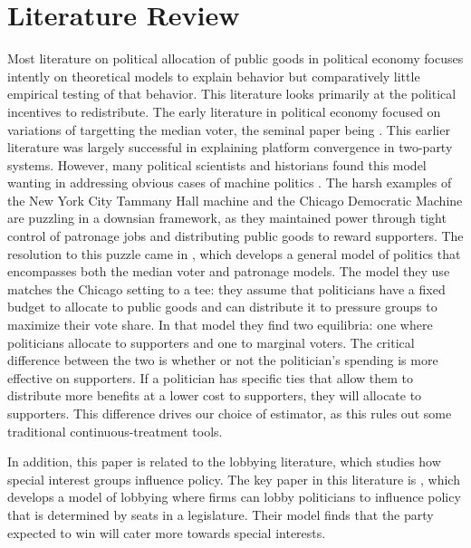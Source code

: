 \section{Literature Review}\label{sec:lit_review}

Most literature on political allocation of public goods in political economy focuses intently on theoretical models to explain behavior but comparatively little empirical testing of that behavior. 
This literature looks primarily at the political incentives to redistribute.
The early literature in political economy focused on variations of targetting the median voter, the seminal paper being \cite{downs1957economic}.
This earlier literature was largely successful in explaining platform convergence in two-party systems.
However, many political scientists and historians found this model wanting in addressing obvious cases of machine politics \cite{rakove1975don} \cite{golway2014machine}.
The harsh examples of the New York City Tammany Hall machine and the Chicago Democratic Machine are puzzling in a downsian framework, as they maintained power through tight control of patronage jobs and distributing public goods to reward supporters.
The resolution to this puzzle came in \cite{dixit_londregan1996}, which develops a general model of politics that encompasses both the median voter and patronage models.
The model they use matches the Chicago setting to a tee: they assume that politicians have a fixed budget to allocate to public goods and can distribute it to pressure groups to maximize their vote share.
In that model they find two equilibria: one where politicians allocate to supporters and one to marginal voters.
The critical difference between the two is whether or not the politician's spending is more effective on supporters. 
If a politician has specific ties that allow them to distribute more benefits at a lower cost to supporters, they will allocate to supporters.
This difference drives our choice of estimator, as this rules out some traditional continuous-treatment tools. 

In addition, this paper is related to the lobbying literature, which studies how special interest groups influence policy. 
The key paper in this literature is \cite{grossman_helpman_1994}, which develops a model of lobbying where firms can lobby politicians to influence policy that is determined by seats in a legislature. 
Their model finds that the party expected to win will cater more towards special interests.

